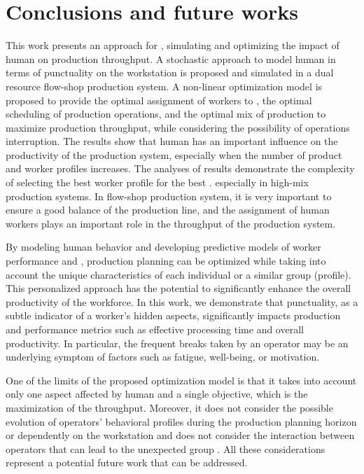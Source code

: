 \documentclass[review,12pt, 3p, times]{elsarticle}
\begin{document}
\section{Conclusions and future works  }\label{sec:conc3}  
This work presents an approach for , simulating and optimizing the impact of human  on production throughput. A stochastic approach to model human  in terms of punctuality on the workstation is proposed and simulated in a dual resource flow-shop production system. A non-linear optimization model is proposed to provide the optimal assignment of workers to , the optimal scheduling of production operations, and the optimal mix of production to maximize production throughput, while considering the possibility of operations interruption. The results show that human  has an important influence on the productivity of the production system, especially when the number of product and worker profiles increases. The analyses of results demonstrate the complexity of selecting the best worker profile for the best . especially in high-mix production systems. In  flow-shop production system, it is very important to ensure a good balance of the production line, and the assignment of human workers plays an important role in  the throughput of the production system.

By modeling human behavior and developing predictive models of worker performance and , production planning can be optimized while taking into account the unique characteristics of each individual or a similar group (profile). This personalized approach has the potential to significantly enhance the overall productivity of the workforce. In this work, we demonstrate that punctuality, as a subtle indicator of a worker's hidden aspects, significantly impacts production and performance metrics such as effective processing time and overall productivity. In particular, the frequent breaks taken by an operator may be an underlying symptom of factors such as fatigue, well-being, or motivation. 

One of the limits of the proposed optimization model is that it takes into account only one aspect affected by human  and a single objective, which is the maximization of the throughput. Moreover, it does not consider the possible evolution of operators' behavioral profiles during the production planning horizon or dependently on the workstation and does not consider the interaction between operators that can lead to the unexpected group . All these considerations represent a potential future work that can be addressed.
\end{document}
